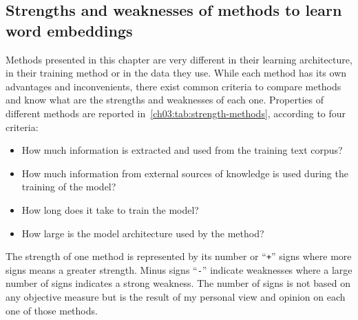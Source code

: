   \subsection{Strengths and weaknesses of methods to learn word embeddings}
    Methods presented in this chapter are very different in their learning
    architecture, in their training method or in the data they use. While each
    method has its own advantages and inconvenients, there exist common
    criteria to compare methods and know what are the strengths and weaknesses
    of each one. Properties of different methods are reported
    in~\autoref{ch03:tab:strength-methods}, according to four criteria:

    \begin{itemize}
      \item How much information is extracted and used from the training text
        corpus?
      \item How much information from external sources of knowledge is used
        during the training of the model?
      \item How long does it take to train the model?
      \item How large is the model architecture used by the method?
    \end{itemize}

    \noindent The strength of one method is represented by its number or
    ``\texttt{+}'' signs where more signs means a greater strength. Minus signs
    ``\texttt{-}'' indicate weaknesses where a large number of signs indicates a
    strong weakness. The number of signs is not based on any objective measure
    but is the result of my personal view and opinion on each one of those
    methods.

